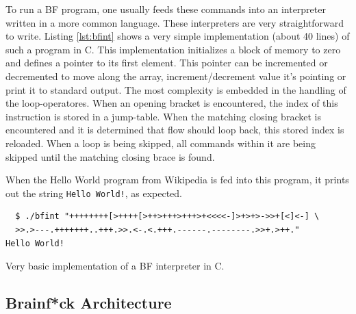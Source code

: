 To run a BF program, one usually feeds these commands into an interpreter written in a more common language. These interpreters are very straightforward to write. Listing \ref{lst:bfint} shows a very simple implementation (about 40 lines) of such a program in C. This implementation initializes a block of memory to zero and defines a pointer to its first element. This pointer can be incremented or decremented to move along the array, increment/decrement value it's pointing or print it to standard output. The most complexity is embedded in the handling of the loop-operatores. When an opening bracket is encountered, the index of this instruction is stored in a jump-table. When the matching closing bracket is encountered and it is determined that flow should loop back, this stored index is reloaded. When a loop is being skipped, all commands within it are being skipped until the matching closing brace is found.

When the Hello World program from Wikipedia \cite{bfwiki} is fed into this program, it prints out the string \texttt{Hello World!}, as expected.
\begin{lstlisting}
  $ ./bfint "++++++++[>++++[>++>+++>+++>+<<<<-]>+>+>->>+[<]<-] \
  >>.>---.+++++++..+++.>>.<-.<.+++.------.--------.>>+.>++."
Hello World!
\end{lstlisting}


\begin{lstfloat}[H]
    
\caption{Very basic implementation of a BF interpreter in C.}
\label{lst:bfint}
\end{lstfloat}



\subsection{Brainf*ck Architecture}
